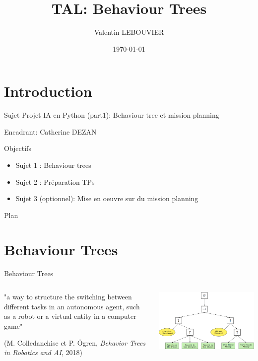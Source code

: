 \documentclass[presentation]{beamer}
\author{Valentin LEBOUVIER}
\date{\today}
\title{TAL: Behaviour Trees}
\begin{document}
\maketitle


\section{Introduction}
\label{sec-1}
\begin{frame}[label=sec-1-0-1]{Sujet}
\alert{Projet IA en Python (part1): Behaviour tree et mission planning}

Encadrant: Catherine DEZAN
\end{frame}

\begin{frame}[label=sec-1-0-2]{Objectifs}
\begin{itemize}
\item Sujet 1 : Behaviour trees
\item Sujet 2 : Préparation TPs
\item Sujet 3 (optionnel): Mise en oeuvre sur du mission planning
\end{itemize}
\end{frame}

\begin{frame}[label=sec-1-0-3]{Plan}
\tableofcontents
\end{frame}


\section{Behaviour Trees}
\label{sec-2}
\begin{frame}[label=sec-2-0-1]{Behaviour Trees}
\begin{columns}
\begin{column}{0.5\textwidth}

"a way to structure the switching between different tasks in an autonomous agent, such as a robot or a virtual entity in a computer game"

(M. Colledanchise et P. Ögren, \emph{Behavior Trees in Robotics and AI}, 2018)
\end{column}
\begin{column}{0.5\textwidth}
\includegraphics[width=.9\linewidth]{./img/BT_search_and_grasp.png}
\end{column}
\end{columns}
\end{frame}
\end{document}
